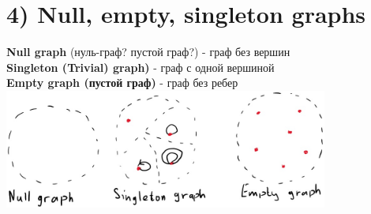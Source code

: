 \documentclass[../TM3-UltraDoc.tex]{subfiles}
\begin{document}
	\section*{4) Null, empty, singleton graphs}
	\textbf{Null graph} (нуль-граф? пустой граф?) - граф без вершин\\
	\textbf{Singleton (Trivial) graph)} - граф с одной вершиной\\
	\textbf{Empty graph (пустой граф)} - граф без ребер\\
	\includegraphics[width = 0.8\textwidth]{4.1}
\end{document}
